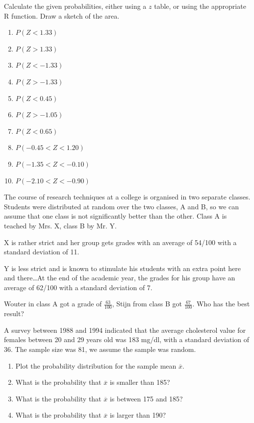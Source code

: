 \begin{exercise}
  Calculate the given probabilities, either using a $z$ table, or using the appropriate R function. Draw a sketch of the area.
  
  \begin{enumerate}[label=\alph*.]
    \item $P(Z < 1.33)$
    \item $P(Z > 1.33)$
    \item $P(Z < -1.33)$
    \item $P(Z > -1.33)$
    \item $P(Z < 0.45)$
    \item $P(Z > -1.05)$
    \item $P(Z < 0.65)$
    \item $P(-0.45 < Z < 1.20)$
    \item $P(-1.35 < Z < -0.10)$
    \item $P(-2.10 < Z < -0.90)$
  \end{enumerate}
\end{exercise}

\begin{exercise}
  The course of research techniques at a college is organised in two separate classes. Students were distributed at random over the two classes, A and B, so we can assume that one class is not significantly better than the other. Class A is teached by Mrs. X, class B by Mr. Y.
  
  X is rather strict and her group gets grades with an average of 54/100 with a standard deviation of 11.
  
  Y is less strict and is known to stimulate his students with an extra point here and there\ldots At the end of the academic year, the grades for his group have an average of 62/100 with a standard deviation of 7.
  
  Wouter in class A got a grade of $\frac{63}{100}$, Stijn from class B got $\frac{67}{100}$. Who has the best result?
\end{exercise}

\begin{exercise}
  A survey between 1988 and 1994 indicated that the average cholesterol value for females between 20 and 29 years old was 183 mg/dl, with a standard deviation of 36. The sample size was 81, we assume the sample was random.
  
  \begin{enumerate}[label=\alph*.]
    \item Plot the probability distribution for the sample mean $\overline{x}$.
    \item What is the probability that $\overline{x}$ is smaller than 185?
    \item What is the probability that $\overline{x}$ is between 175 and 185?
    \item What is the probability that $\overline{x}$ is larger than 190? 
  \end{enumerate}
\end{exercise}

